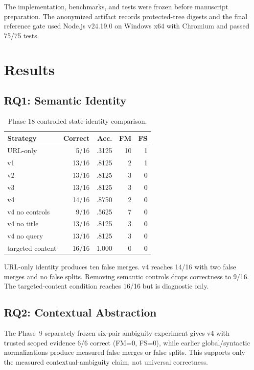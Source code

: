 \documentclass[conference]{IEEEtran}
\begin{document}
The implementation, benchmarks, and tests were frozen before manuscript preparation. The anonymized artifact records protected-tree digests and the final reference gate used Node.js v24.19.0 on Windows x64 with Chromium and passed 75/75 tests.

\section{Results}
\subsection{RQ1: Semantic Identity}
\begin{table}[t]
\caption{Phase 18 controlled state-identity comparison.}
\label{tab:phase18}
\centering
\small
\begin{tabular}{lrrrr}
\toprule
Strategy & Correct & Acc. & FM & FS \\
\midrule
URL-only & 5/16 & .3125 & 10 & 1 \\
v1 & 13/16 & .8125 & 2 & 1 \\
v2 & 13/16 & .8125 & 3 & 0 \\
v3 & 13/16 & .8125 & 3 & 0 \\
v4 & 14/16 & .8750 & 2 & 0 \\
v4 no controls & 9/16 & .5625 & 7 & 0 \\
v4 no title & 13/16 & .8125 & 3 & 0 \\
v4 no query & 13/16 & .8125 & 3 & 0 \\
targeted content & 16/16 & 1.000 & 0 & 0 \\
\bottomrule
\end{tabular}
\end{table}

URL-only identity produces ten false merges. v4 reaches 14/16 with two false merges and no false splits. Removing semantic controls drops correctness to 9/16. The targeted-content condition reaches 16/16 but is diagnostic only.

\subsection{RQ2: Contextual Abstraction}
The Phase~9 separately frozen six-pair ambiguity experiment gives v4 with trusted scoped evidence 6/6 correct (FM=0, FS=0), while earlier global/syntactic normalizations produce measured false merges or false splits. This supports only the measured contextual-ambiguity claim, not universal correctness.
\end{document}
